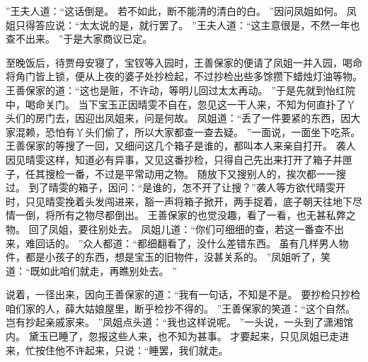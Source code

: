 ”王夫人道：“这话倒是。
若不如此，断不能清的清白的白。
”因问凤姐如何。
凤姐只得答应说：“太太说的是，就行罢了。
”王夫人道：“这主意很是，不然一年也查不出来。
”于是大家商议已定。
\par
至晚饭后，待贾母安寝了，宝钗等入园时，王善保家的便请了凤姐一并入园，喝命将角门皆上锁，便从上夜的婆子处抄检起，不过抄检出些多馀攒下蜡烛灯油等物。
王善保家的道：“这也是赃，不许动，等明儿回过太太再动。
”于是先就到怡红院中，喝命关门。
当下宝玉正因晴雯不自在，忽见这一干人来，不知为何直扑了丫头们的房门去，因迎出凤姐来，问是何故。
凤姐道：“丢了一件要紧的东西，因大家混赖，恐怕有丫头们偷了，所以大家都查一查去疑。
”一面说，一面坐下吃茶。
王善保家的等搜了一回，又细问这几个箱子是谁的，都叫本人来亲自打开。
袭人因见晴雯这样，知道必有异事，又见这番抄检，只得自己先出来打开了箱子并匣子，任其搜检一番，不过是平常动用之物。
随放下又搜别人的，挨次都一一搜过。
到了晴雯的箱子，因问：“是谁的，怎不开了让搜？”袭人等方欲代晴雯开时，只见晴雯挽着头发闯进来，豁一声将箱子掀开，两手捉着，底子朝天往地下尽情一倒，将所有之物尽都倒出。
王善保家的也觉没趣，看了一看，也无甚私弊之物。
回了凤姐，要往别处去。
凤姐儿道：“你们可细细的查，若这一番查不出来，难回话的。
”众人都道：“都细翻看了，没什么差错东西。
虽有几样男人物件，都是小孩子的东西，想是宝玉的旧物件，没甚关系的。
”凤姐听了，笑道：“既如此咱们就走，再瞧别处去。
”\par
说着，一径出来，因向王善保家的道：“我有一句话，不知是不是。
要抄检只抄检咱们家的人，薛大姑娘屋里，断乎检抄不得的。
”王善保家的笑道：“这个自然。
岂有抄起亲戚家来。
”凤姐点头道：“我也这样说呢。
”一头说，一头到了潇湘馆内。
黛玉已睡了，忽报这些人来，也不知为甚事。
才要起来，只见凤姐已走进来，忙按住他不许起来，只说：“睡罢，我们就走。
